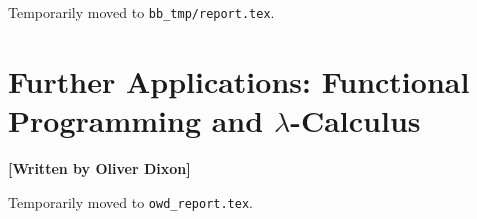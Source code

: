 \documentclass[10pt,a4paper,reqno]{amsart}
\numberwithin{figure}{section}
\begin{document}
\noindent Temporarily moved to \texttt{bb\_tmp/report.tex}.

\section{Further Applications: %
        Functional Programming and \texorpdfstring{$\lambda$}{Lambda}-Calculus}
\begin{flushright}
        \textbf{[Written by Oliver Dixon]}
\end{flushright}

\noindent Temporarily moved to \texttt{owd\_report.tex}.
\end{document}
